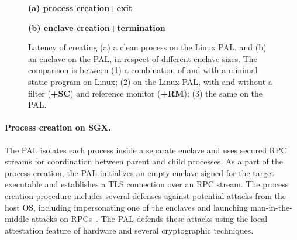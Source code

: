 \begin{figure*}[t!]
\centering
\footnotesize
{}
\parbox{0.59\textwidth}{\centering\bf (a) process creation+exit}
\parbox{0.39\textwidth}{\centering\bf (b) \sgx{} enclave creation+termination}
\caption{Latency of creating (a) a clean process on the Linux PAL, and (b) an enclave on the \sgx{} PAL, in respect of different enclave sizes.
The comparison is between (1) a combination of  and  with a minimal static program on Linux; (2)  on the Linux PAL, with and without a \seccomp{} filter ({\bf +SC}) and reference monitor ({\bf +RM}); (3) the same \hostapi{} on the \sgx{} PAL.}
\label{fig:eval:pal:proc-latency}
\end{figure*}













\paragraph{Process creation on SGX.}
The \sgx{} PAL isolates each process inside a separate enclave
and uses secured RPC streams
for coordination between parent and child processes.
As a part of the process creation,
the \sgx{} PAL initializes an empty enclave
signed for the target executable
and establishes a TLS connection over an RPC stream.
The process creation procedure
includes several defenses against potential attacks
from the host OS,
including impersonating one of the enclaves and launching man-in-the-middle attacks on RPCs~\cite{shinde17panoply}.
The \sgx{} PAL defends these attacks
using the local attestation feature of \sgx{} hardware and several cryptographic techniques.



